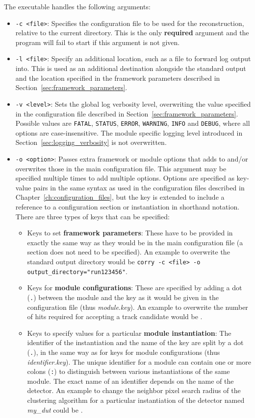 The executable handles the following arguments:
\begin{itemize}
\item \texttt{-c <file>}: Specifies the configuration file to be used for the reconstruction, relative to the current directory.
This is the only \textbf{required} argument and the program will fail to start if this argument is not given.
\item \texttt{-l <file>}: Specify an additional location, such as a file to forward log output into. This is used as an additional destination alongside the standard output and the location specified in the framework parameters described in Section~\ref{sec:framework_parameters}.
\item \texttt{-v <level>}: Sets the global log verbosity level, overwriting the value specified in the configuration file described in Section~\ref{sec:framework_parameters}.
Possible values are \texttt{FATAL}, \texttt{STATUS}, \texttt{ERROR}, \texttt{WARNING}, \texttt{INFO} and \texttt{DEBUG}, where all options are case-insensitive.
The module specific logging level introduced in Section~\ref{sec:logging_verbosity} is not overwritten.
\item \texttt{-o <option>}: Passes extra framework or module options that adds to and/or overwrites those in the main configuration file.
This argument may be specified multiple times to add multiple options.
Options are specified as key-value pairs in the same syntax as used in the configuration files described in Chapter~\ref{ch:configuration_files}, but the key is extended to include a reference to a configuration section or instantiation in shorthand notation.
There are three types of keys that can be specified:
\begin{itemize}
    \item Keys to set \textbf{framework parameters}: These have to be provided in exactly the same way as they would be in the main configuration file (a section does not need to be specified). An example to overwrite the standard output directory would be \texttt{corry -c <file> -o output\_directory="run123456"}.
    \item Keys for \textbf{module configurations}: These are specified by adding a dot (\texttt{.}) between the module and the key as it would be given in the configuration file (thus \textit{module}.\textit{key}). An example to overwrite the number of hits required for accepting a track candidate would be .
    \item Keys to specify values for a particular \textbf{module instantiation}: The identifier of the instantiation and the name of the key are split by a dot (\texttt{.}), in the same way as for keys for module configurations (thus \textit{identifier}.\textit{key}). The unique identifier for a module can contain one or more colons (\texttt{:}) to distinguish between various instantiations of the same module. The exact name of an identifier depends on the name of the detector. An example to change the neighbor pixel search radius of the clustering algorithm for a particular instantiation of the detector named \textit{my\_dut} could be .

\end{itemize}
\end{itemize}
